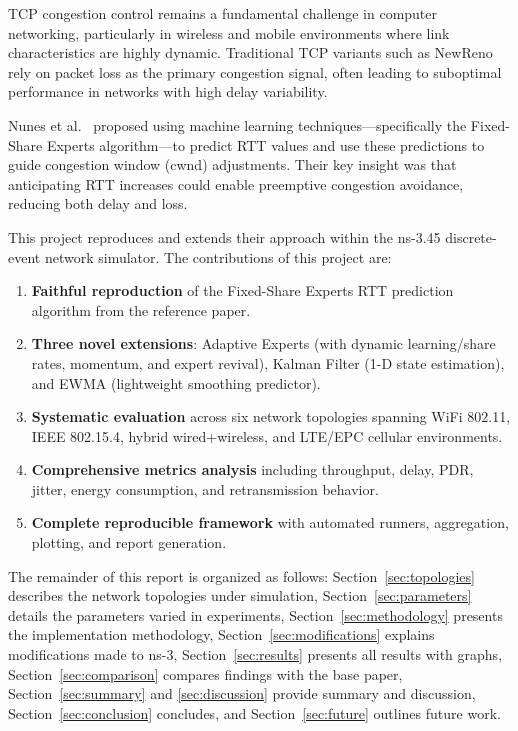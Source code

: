 \documentclass[12pt,a4paper]{article}
\begin{document}
TCP congestion control remains a fundamental challenge in computer networking, particularly in wireless and mobile environments where link characteristics are highly dynamic. Traditional TCP variants such as NewReno rely on packet loss as the primary congestion signal, often leading to suboptimal performance in networks with high delay variability.

Nunes et al.~\cite{nunes2011} proposed using machine learning techniques---specifically the Fixed-Share Experts algorithm---to predict RTT values and use these predictions to guide congestion window (cwnd) adjustments. Their key insight was that anticipating RTT increases could enable preemptive congestion avoidance, reducing both delay and loss.

This project reproduces and extends their approach within the ns-3.45 discrete-event network simulator. The contributions of this project are:

\begin{enumerate}[label=(\arabic*)]
    \item \textbf{Faithful reproduction} of the Fixed-Share Experts RTT prediction algorithm from the reference paper.
    \item \textbf{Three novel extensions}: Adaptive Experts (with dynamic learning/share rates, momentum, and expert revival), Kalman Filter (1-D state estimation), and EWMA (lightweight smoothing predictor).
    \item \textbf{Systematic evaluation} across six network topologies spanning WiFi 802.11, IEEE 802.15.4, hybrid wired+wireless, and LTE/EPC cellular environments.
    \item \textbf{Comprehensive metrics analysis} including throughput, delay, PDR, jitter, energy consumption, and retransmission behavior.
    \item \textbf{Complete reproducible framework} with automated runners, aggregation, plotting, and report generation.
\end{enumerate}

The remainder of this report is organized as follows: Section~\ref{sec:topologies} describes the network topologies under simulation, Section~\ref{sec:parameters} details the parameters varied in experiments, Section~\ref{sec:methodology} presents the implementation methodology, Section~\ref{sec:modifications} explains modifications made to ns-3, Section~\ref{sec:results} presents all results with graphs, Section~\ref{sec:comparison} compares findings with the base paper, Section~\ref{sec:summary} and \ref{sec:discussion} provide summary and discussion, Section~\ref{sec:conclusion} concludes, and Section~\ref{sec:future} outlines future work.
\end{document}

